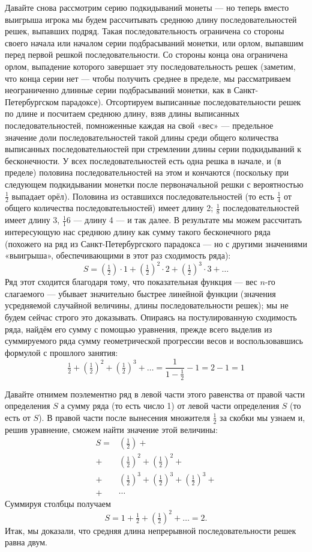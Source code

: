 \documentclass{article}
\begin{document}
Давайте снова рассмотрим серию подкидываний монеты --- но теперь вместо выигрыша игрока мы будем рассчитывать среднюю длину последовательностей решек, выпавших подряд. Такая последовательность ограничена со стороны своего начала или началом серии подбрасываний монетки, или орлом, выпавшим перед первой решкой последовательности. Со стороны конца она ограничена орлом, выпадение которого завершает эту последовательность решек (заметим, что конца серии нет --- чтобы получить среднее в пределе, мы рассматриваем неограниченно длинные серии подбрасываний монетки, как в Санкт-Петербургском парадоксе). Отсортируем выписанные последовательности решек по длине и посчитаем среднюю длину, взяв длины выписанных последовательностей, помноженные каждая на свой «вес» --- предельное значение доли последовательностей такой длины среди общего количества выписанных последовательностей при стремлении длины серии подкидываний к бесконечности. 
У всех последовательностей есть одна решка в начале, и (в пределе) половина последовательностей на этом и кончаются 
(поскольку при следующем подкидывании монетки после первоначальной решки с вероятностью $\tfrac12$  выпадает орёл). 
Половина из оставшихся последовательностей (то есть $\tfrac14$ от общего количества последовательностей) имеет длину 2;
$\tfrac18$ последовательностей имеет длину 3, 
$\tfrac116$ --- длину 4 
--- и так далее. 
В результате мы можем рассчитать интересующую нас среднюю длину как сумму такого бесконечного ряда (похожего на ряд из Санкт-Петербургского парадокса --- но с другими значениями «выигрыша», обеспечивающими в этот раз сходимость ряда):
\[S=(\tfrac12)\cdot 1+(\tfrac12)^2\cdot 2+(\tfrac12)^3\cdot 3+\dots\]
Ряд этот сходится благодаря тому, что показательная функция --- вес $n$-го слагаемого --- убывает значительно быстрее линейной функции (значения усредняемой случайной величины, длины последовательности решек); мы не будем сейчас строго это доказывать. 
Опираясь на постулированную сходимость ряда, найдём его сумму с помощью уравнения, прежде всего выделив из суммируемого ряда сумму геометрической прогрессии весов и воспользовавшись формулой с прошлого занятия:
\[\tfrac12+(\tfrac12)^2+(\tfrac12)^3+\dots=\frac1{1-\frac12}-1=2-1=1\]

Давайте отнимем поэлементно ряд в левой части этого равенства от правой части определения $S$ а сумму ряда (то есть число 1) от левой части определения $S$ (то есть от $S$). 
В правой части после вынесения множителя $\tfrac12$ за скобки мы узнаем  и, решив уравнение, сможем найти значение этой величины:
\begin{align*}
S
=&(\tfrac12)+
\\
+&(\tfrac12)^2+(\tfrac12)^2+
\\
+&(\tfrac12)^3+(\tfrac12)^3+(\tfrac12)^3+
\\
+&\cdots
\end{align*}
Суммируя столбцы получаем
\[S=1+\tfrac12+(\tfrac12)^2+\dots=2.\]
Итак, мы доказали, что средняя длина непрерывной последовательности решек равна двум. 
\end{document}
